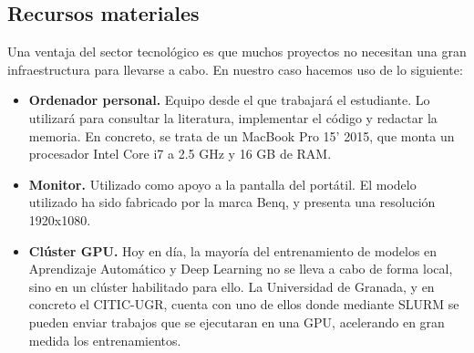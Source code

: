 \subsection*{Recursos materiales}

Una ventaja del sector tecnológico es que muchos proyectos no necesitan una gran infraestructura para llevarse a cabo. En nuestro caso hacemos uso de lo siguiente:
\begin{itemize}
    \item \textbf{Ordenador personal.} Equipo desde el que trabajará el estudiante. Lo utilizará para consultar la literatura, implementar el código y redactar la memoria. En concreto, se trata de un MacBook Pro 15' 2015, que monta un procesador Intel Core i7 a 2.5 GHz y 16 GB de RAM.
    \item \textbf{Monitor.} Utilizado como apoyo a la pantalla del portátil. El modelo utilizado ha sido fabricado por la marca Benq, y presenta una resolución 1920x1080.
    \item \textbf{Clúster GPU.} Hoy en día, la mayoría del entrenamiento de modelos en Aprendizaje Automático y Deep Learning no se lleva a cabo de forma local, sino en un clúster habilitado para ello. La Universidad de Granada, y en concreto el CITIC-UGR, cuenta con uno de ellos donde mediante SLURM se pueden enviar trabajos que se ejecutaran en una GPU, acelerando en gran medida los entrenamientos.
\end{itemize}

